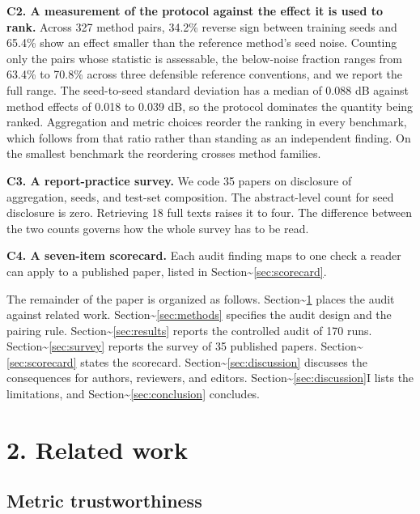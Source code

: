 \documentclass[pdflatex,sn-nature]{sn-jnl}
\begin{document}
\textbf{C2. A measurement of the protocol against the effect it is used to rank.} Across 327 method pairs, 34.2\% reverse sign between training seeds and 65.4\% show an effect smaller than the reference method's seed noise. Counting only the pairs whose statistic is assessable, the below-noise fraction ranges from 63.4\% to 70.8\% across three defensible reference conventions, and we report the full range. The seed-to-seed standard deviation has a median of 0.088 dB against method effects of 0.018 to 0.039 dB, so the protocol dominates the quantity being ranked. Aggregation and metric choices reorder the ranking in every benchmark, which follows from that ratio rather than standing as an independent finding. On the smallest benchmark the reordering crosses method families.

\textbf{C3. A report-practice survey.} We code 35 papers on disclosure of aggregation, seeds, and test-set composition. The abstract-level count for seed disclosure is zero. Retrieving 18 full texts raises it to four. The difference between the two counts governs how the whole survey has to be read.

\textbf{C4. A seven-item scorecard.} Each audit finding maps to one check a reader can apply to a published paper, listed in Section\textasciitilde{}\ref{sec:scorecard}.

The remainder of the paper is organized as follows. Section\textasciitilde{}\ref{sec:related} places the audit against related work. Section\textasciitilde{}\ref{sec:methods} specifies the audit design and the pairing rule. Section\textasciitilde{}\ref{sec:results} reports the controlled audit of 170 runs. Section\textasciitilde{}\ref{sec:survey} reports the survey of 35 published papers. Section\textasciitilde{}\ref{sec:scorecard} states the scorecard. Section\textasciitilde{}\ref{sec:discussion} discusses the consequences for authors, reviewers, and editors. Section\textasciitilde{}\ref{sec:discussion}I lists the limitations, and Section\textasciitilde{}\ref{sec:conclusion} concludes.

\section{2. Related work}\label{sec:related}

\subsection{Metric trustworthiness}\label{sec:metric}
\end{document}
